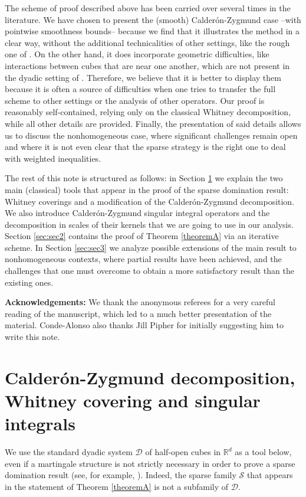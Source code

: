 \documentclass[12pt]{amsart}
\newcommand{\R}{\mathbb{R}}
\newcommand{\Ss}{\mathcal{S}}
\newcommand{\D}{\mathscr{D}}
\theoremstyle{plain}
\theoremstyle{definition} %
\numberwithin{equation}{section}
\begin{document}
The scheme of proof described above has been carried over several times in the literature. We have chosen to present the (smooth) Calder\'on-Zygmund case --with pointwise smoothness bounds-- because we find that it illustrates the method in a clear way, without the additional technicalities of other settings, like the rough one of \cite{CACDPO2017}. On the other hand, it does incorporate geometric difficulties, like interactions between cubes that are near one another, which are not present in the dyadic setting of \cite{CuDPOu2018}. Therefore, we believe that it is better to display them because it is often a source of difficulties when one tries to transfer the full scheme to other settings or the analysis of other operators. Our proof is reasonably self-contained, relying only on the classical Whitney decomposition, while all other details are provided. Finally, the presentation of said details allows us to discuss the nonhomogeneous case, where significant challenges remain open and where it is not even clear that the sparse strategy is the right one to deal with weighted inequalities. 

The rest of this note is structured as follows: in Section \ref{sec:sec1} we explain the two main (classical) tools that appear in the proof of the sparse domination result: Whitney coverings and a modification of the Calder\'on-Zygmund decomposition. We also introduce Calder\'on-Zygmund singular integral operators and the decomposition in scales of their kernels that we are going to use in our analysis. Section \ref{sec:sec2} contains the proof of Theorem \ref{theoremA} via an iterative scheme. In Section \ref{sec:sec3} we analyze possible extensions of the main result to nonhomogeneous contexts, where partial results have been achieved, and the challenges that one must overcome to obtain a more satisfactory result than the existing ones. 

\noindent\textbf{Acknowledgements:} We thank the anonymous referees for a very careful reading of the manuscript, which led to a much better presentation of the material. Conde-Alonso also thanks Jill Pipher for initially suggesting him to write this note.

\section{Calder\'on-Zygmund decomposition, Whitney covering and singular integrals} \label{sec:sec1}

We use the standard dyadic system $\D$ of half-open cubes in $\R^d$ as a tool below, even if a martingale structure is not strictly necessary in order to prove a sparse domination result (see, for example, \cite{CADPPV2022}). Indeed, the sparse family $\Ss$ that appears in the statement of Theorem \ref{theoremA} is not a subfamily of $\D$.
\end{document}
